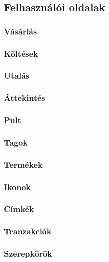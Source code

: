 \subsection{Felhasználói oldalak}

\subsubsection{Vásárlás}

\subsubsection{Költések}

\subsubsection{Utalás}

\subsubsection{Áttekintés}

\subsubsection{Pult}

\subsubsection{Tagok}

\subsubsection{Termékek}

\subsubsection{Ikonok}

\subsubsection{Címkék}

\subsubsection{Tranzakciók}

\subsubsection{Szerepkörök}

